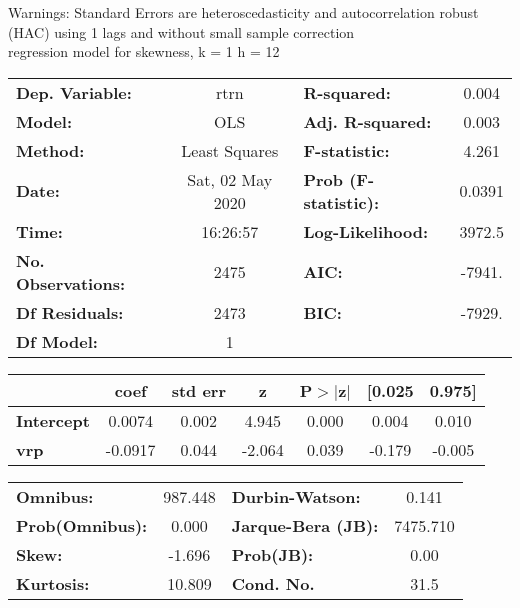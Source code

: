 Warnings: \newline
 [1] Standard Errors are heteroscedasticity and autocorrelation robust (HAC) using 1 lags and without small sample correction\\ 

regression model for skewness, k = 1 h = 12\begin{center}
\begin{tabular}{lclc}
\toprule
\textbf{Dep. Variable:}    &       rtrn       & \textbf{  R-squared:         } &     0.004   \\
\textbf{Model:}            &       OLS        & \textbf{  Adj. R-squared:    } &     0.003   \\
\textbf{Method:}           &  Least Squares   & \textbf{  F-statistic:       } &     4.261   \\
\textbf{Date:}             & Sat, 02 May 2020 & \textbf{  Prob (F-statistic):} &   0.0391    \\
\textbf{Time:}             &     16:26:57     & \textbf{  Log-Likelihood:    } &    3972.5   \\
\textbf{No. Observations:} &        2475      & \textbf{  AIC:               } &    -7941.   \\
\textbf{Df Residuals:}     &        2473      & \textbf{  BIC:               } &    -7929.   \\
\textbf{Df Model:}         &           1      & \textbf{                     } &             \\
\bottomrule
\end{tabular}
\begin{tabular}{lcccccc}
                   & \textbf{coef} & \textbf{std err} & \textbf{z} & \textbf{P$> |$z$|$} & \textbf{[0.025} & \textbf{0.975]}  \\
\midrule
\textbf{Intercept} &       0.0074  &        0.002     &     4.945  &         0.000        &        0.004    &        0.010     \\
\textbf{vrp}       &      -0.0917  &        0.044     &    -2.064  &         0.039        &       -0.179    &       -0.005     \\
\bottomrule
\end{tabular}
\begin{tabular}{lclc}
\textbf{Omnibus:}       & 987.448 & \textbf{  Durbin-Watson:     } &    0.141  \\
\textbf{Prob(Omnibus):} &   0.000 & \textbf{  Jarque-Bera (JB):  } & 7475.710  \\
\textbf{Skew:}          &  -1.696 & \textbf{  Prob(JB):          } &     0.00  \\
\textbf{Kurtosis:}      &  10.809 & \textbf{  Cond. No.          } &     31.5  \\
\bottomrule
\end{tabular}
\end{center}

